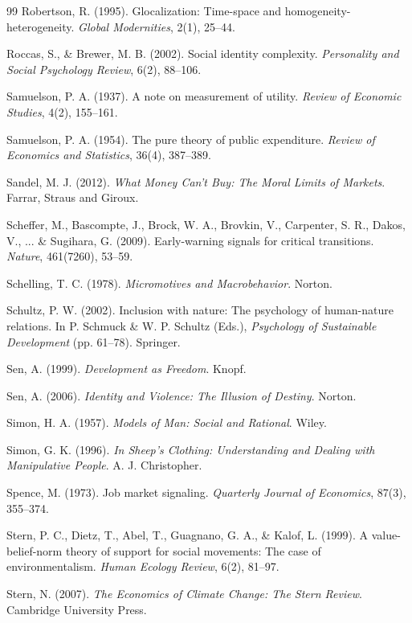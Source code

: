 \begin{thebibliography}{99}
Robertson, R. (1995).
Glocalization: Time-space and homogeneity-heterogeneity.
\textit{Global Modernities}, 2(1), 25--44.

Roccas, S., \& Brewer, M. B. (2002).
Social identity complexity.
\textit{Personality and Social Psychology Review}, 6(2), 88--106.

Samuelson, P. A. (1937).
A note on measurement of utility.
\textit{Review of Economic Studies}, 4(2), 155--161.

Samuelson, P. A. (1954).
The pure theory of public expenditure.
\textit{Review of Economics and Statistics}, 36(4), 387--389.

Sandel, M. J. (2012).
\textit{What Money Can't Buy: The Moral Limits of Markets}.
Farrar, Straus and Giroux.

Scheffer, M., Bascompte, J., Brock, W. A., Brovkin, V., Carpenter, S. R., Dakos, V., ... \& Sugihara, G. (2009).
Early-warning signals for critical transitions.
\textit{Nature}, 461(7260), 53--59.

Schelling, T. C. (1978).
\textit{Micromotives and Macrobehavior}.
Norton.

Schultz, P. W. (2002).
Inclusion with nature: The psychology of human-nature relations.
In P. Schmuck \& W. P. Schultz (Eds.), \textit{Psychology of Sustainable Development} (pp. 61--78).
Springer.

Sen, A. (1999).
\textit{Development as Freedom}.
Knopf.

Sen, A. (2006).
\textit{Identity and Violence: The Illusion of Destiny}.
Norton.

Simon, H. A. (1957).
\textit{Models of Man: Social and Rational}.
Wiley.

Simon, G. K. (1996).
\textit{In Sheep's Clothing: Understanding and Dealing with Manipulative People}.
A. J. Christopher.

Spence, M. (1973).
Job market signaling.
\textit{Quarterly Journal of Economics}, 87(3), 355--374.

Stern, P. C., Dietz, T., Abel, T., Guagnano, G. A., \& Kalof, L. (1999).
A value-belief-norm theory of support for social movements: The case of environmentalism.
\textit{Human Ecology Review}, 6(2), 81--97.

Stern, N. (2007).
\textit{The Economics of Climate Change: The Stern Review}.
Cambridge University Press.


\end{thebibliography}
